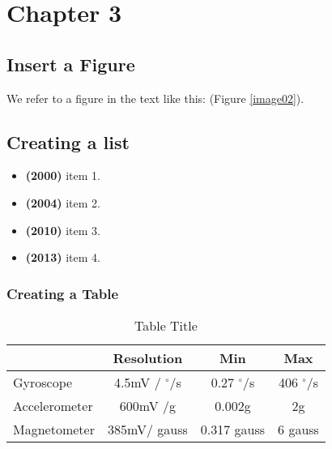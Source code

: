 
\chapter{Chapter 3} %

\ifpdf
    \graphicspath{{3_chapter3/figures/PNG/}{3_chapter3/figures/PDF/}{3_chapter3/figures/}}
\else
    \graphicspath{{3_chapter3/figures/EPS/}{3_chapter3/figures/}}
\fi





\section{Insert a Figure}
 We refer to a figure in the text like this:  (Figure \ref{image02}).
 
 


\section{Creating a list}

\begin{itemize} \itemsep1pt \parskip0pt 
\item \textbf{(2000)} item 1. 
\item \textbf{(2004)} item 2. 
\item \textbf{(2010)} item 3. 
\item \textbf{(2013)} item 4. 
\end{itemize}


\subsection{Creating a Table}

\begin{table}[htpp]
\caption{Table Title}
\begin{center}
\begin{tabular}{| p{3cm} | c | c | c |}
\hline 
 & Resolution & Min & Max \\ \hline 
Gyroscope & 4.5mV / {$^{\circ}$}/s & 0.27 $^{\circ}$/s & 406 $^{\circ}$/s \\ \hline
Accelerometer & 600mV /g &  0.002g & 2g \\ \hline
Magnetometer & 385mV/ gauss & 0.317 gauss & 6 gauss \\ \hline
\end{tabular}
\end{center}
\label{Sensors' Resolution}
\end{table}%


